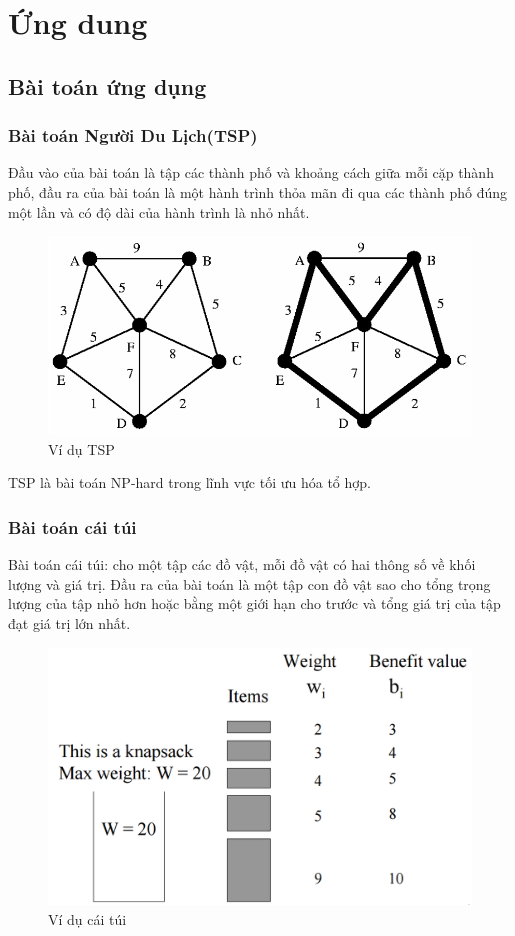 \documentclass[a4paper,12pt]{report}
\begin{document}
\chapter{Ứng dung}
\section{Bài toán ứng dụng}
\subsection{Bài toán Người Du Lịch(TSP)}
Đầu vào của bài toán là tập các thành phố và khoảng cách giữa mỗi cặp thành phố, đầu ra của bài toán là một hành trình thỏa mãn đi qua các thành phố đúng một lần và có độ dài của hành trình là nhỏ nhất.\\

\begin{figure}[H]
\center
\includegraphics[scale=0.5]{TSP_example.PNG}
\caption{Ví dụ TSP}
\end{figure}

TSP là bài toán NP-hard trong lĩnh vực tối ưu hóa tổ hợp.
\subsection{Bài toán cái túi}
Bài toán cái túi: cho một tập các đồ vật, mỗi đồ vật có hai thông số về khối lượng và giá trị. Đầu ra của bài toán là một tập con đồ vật sao cho tổng trọng lượng của tập nhỏ hơn hoặc bằng một giới hạn cho trước và tổng giá trị của tập đạt giá trị lớn nhất.
\begin{figure}[H]
\center
\includegraphics[scale=0.5]{KP_example.PNG}
\caption{Ví dụ cái túi}
\end{figure}
\end{document}
